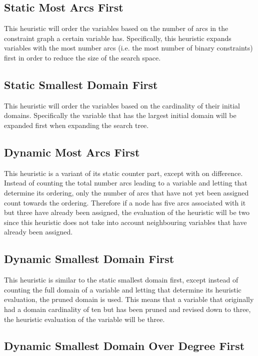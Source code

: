 \documentclass{article}
\begin{document}
\subsection{Static Most Arcs First}

This heuristic will order the variables based on the number of arcs in the
constraint graph a certain variable has. Specifically, this heuristic expands
variables with the most number arcs (i.e. the most number of binary
constraints) first in order to reduce the size of the search space.

\subsection{Static Smallest Domain First}

This heuristic will order the variables based on the cardinality of their
initial domains.  Specifically the variable that has the largest initial domain
will be expanded first when expanding the search tree.

\subsection{Dynamic Most Arcs First}

This heuristic is a variant of its static counter part, except with on
difference. Instead of counting the total number arcs leading to a variable and
letting that determine its ordering, only the number of arcs that have not yet
been assigned count towards the ordering. Therefore if a node has five arcs
associated with it but three have already been assigned, the evaluation of the
heuristic will be two since this heuristic does not take into account
neighbouring variables that have already been assigned.

\subsection{Dynamic Smallest Domain First}

This heuristic is similar to the static smallest domain first, except instead
of counting the full domain of a variable and letting that determine its
heuristic evaluation, the pruned domain is used. This means that a variable
that originally had a domain cardinality of ten but has been pruned and revised
down to three, the heuristic evaluation of the variable will be three.

\subsection{Dynamic Smallest Domain Over Degree First}
\end{document}
